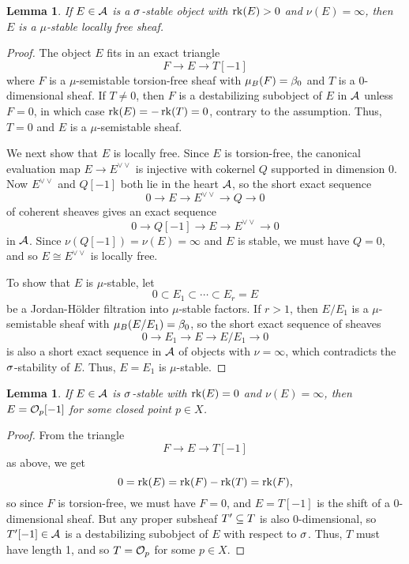 \documentclass[letterpaper,11pt]{amsart}%
\newtheorem{lem}[thm]{Lemma}
\theoremstyle{remark}
\begin{document}
\begin{lem}\label{sigmaStablePosRkIsMuStable}
    If $E \in \mathcal{A}$ is a $\sigma$-stable object with $\operatorname{\mathrm{rk}}(E) > 0$ and $\nu(E) = \infty$, then $E$ is a $\mu$-stable locally free sheaf.
\end{lem}
\begin{proof}
    The object $E$ fits in an exact triangle
    \[ F \to E \to T[-1] \]
    where $F$ is a $\mu$-semistable torsion-free sheaf with $\mu_B(F) = \beta_0$ and $T$ is a 0-dimensional sheaf. If $T \neq 0$, then $F$ is a destabilizing subobject of $E$ in $\mathcal{A}$ unless $F = 0$, in which case $\operatorname{\mathrm{rk}}(E) = -\operatorname{\mathrm{rk}}(T) = 0$, contrary to the assumption. Thus, $T = 0$ and $E$ is a $\mu$-semistable sheaf.
    
    We next show that $E$ is locally free. Since $E$ is torsion-free, the canonical evaluation map $E \to E^{\vee \vee}$ is injective with cokernel $Q$ supported in dimension 0. Now $E^{\vee\vee}$ and $Q[-1]$ both lie in the heart $\mathcal{A}$, so the short exact sequence 
    \[ 0 \to E \to E^{\vee \vee} \to Q \to 0 \]
    of coherent sheaves gives an exact sequence
    \[ 0 \to Q[-1] \to E \to E^{\vee \vee} \to 0 \]
    in $\mathcal{A}$. Since $\nu(Q[-1]) = \nu(E) = \infty$ and $E$ is stable, we must have $Q = 0$, and so $E \cong E^{\vee\vee}$ is locally free.
    
    To show that $E$ is $\mu$-stable, let
    \[ 0 \subset E_1 \subset \cdots \subset E_r = E \]
    be a Jordan-H\"older filtration into $\mu$-stable factors. If $r > 1$, then $E/E_1$ is a $\mu$-semistable sheaf with $\mu_B(E/E_1) = \beta_0$, so the short exact sequence of sheaves
    \[ 0 \to E_1 \to E \to E/E_1 \to 0 \]
    is also a short exact sequence in $\mathcal{A}$ of objects with $\nu = \infty$, which contradicts the $\sigma$-stability of $E$. Thus, $E = E_1$ is $\mu$-stable.
\end{proof}

\begin{lem}\label{sigmaStableRk0isSkyscraper}
    If $E \in \mathcal{A}$ is $\sigma$-stable with $\operatorname{\mathrm{rk}}(E) = 0$ and $\nu(E) = \infty$, then $E = \mathcal{O}_p[-1]$ for some closed point $p \in X$.
\end{lem}
\begin{proof}
    From the triangle
    \[ F \to E \to T[-1] \]
    as above, we get 
    \[ 0 = \operatorname{\mathrm{rk}}(E) = \operatorname{\mathrm{rk}}(F) - \operatorname{\mathrm{rk}}(T) = \operatorname{\mathrm{rk}}(F), \]
    so since $F$ is torsion-free, we must have $F = 0$, and $E = T[-1]$ is the shift of a 0-dimensional sheaf. But any proper subsheaf $T' \subseteq T$ is also 0-dimensional, so $T'[-1] \in \mathcal{A}$ is a destabilizing subobject of $E$ with respect to $\sigma$. Thus, $T$ must have length 1, and so $T = \mathcal{O}_p$ for some $p \in X$.
\end{proof}
\end{document}
